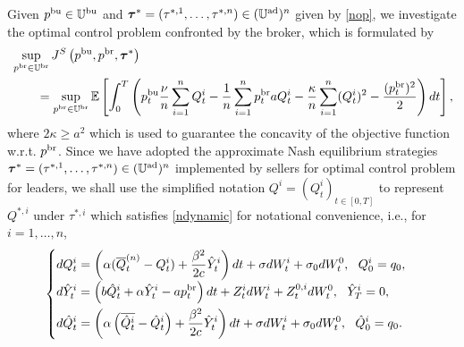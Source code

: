\documentclass[11pt]{article}
\numberwithin{equation}{section}
\begin{document}
Given $p^{{\rm bu}}\in\mathbb{U}^{\rm bu}$ and $\boldsymbol{\tau}^*=(\tau^{*,1}, \ldots, \tau^{*,n})\in(\mathbb{U}^{\rm ad})^n$ given by \eqref{nop}, we investigate the optimal control problem confronted by the broker, which is formulated by
\begin{align}\label{brp}
&\sup_{p^{{\rm br}}\in\mathbb{U}^{\rm br}}J^S\left(p^{{\rm bu}}, p^{{\rm br}}, \boldsymbol{\tau}^*\right)\nonumber\\
&\qquad=\sup_{p^{{\rm br}}\in\mathbb{U}^{\rm br}}\mathbb{E}\left[\int_0^T\left(p_t^{{\rm bu}}\frac{\nu}{n}\sum_{i=1}^nQ_t^i-\frac{1}{n}\sum_{i=1}^np_t^{{\rm br}}aQ_t^i-\frac{\kappa}{n}\sum_{i=1}^n( Q_t^i)^2-\frac{(p_t^{{\rm br}})^2}{2}\right)dt\right],
\end{align}
where $2\kappa\geq a^2$ which is used to guarantee the concavity of the objective function w.r.t. $p^{{\rm br}}$. Since we have adopted the approximate Nash equilibrium strategies $\boldsymbol{\tau}^*=(\tau^{*,1}, \ldots, \tau^{*,n})\in(\mathbb{U}^{\rm ad})^n$ implemented by sellers for optimal control problem for leaders, we shall use the simplified notation $Q^i=(Q_t^i)_{t\in[0,T]}$ to represent $Q^{*,i}$ under $\tau^{*,i}$ which satisfies \eqref{ndynamic} for notational convenience, i.e., for $i=1,\ldots,n$,
\begin{align}\label{fbsde4.1}
\begin{cases}
\displaystyle dQ_t^i=\left(\alpha(\overline{Q}_t^{(n)}-Q_t^i)+\frac{\beta^2}{2c}\hat{Y}_t^i\right)dt+\sigma dW_t^i+\sigma_0dW_t^0,~~Q_0^i=q_0,\\[0.6em]
\displaystyle d\hat{Y}_t^i=\left(b\hat{Q}_t^i+\alpha\hat{Y}_t^i- ap_t^{{\rm br}}\right)dt+Z_t^idW_t^i+Z_t^{0,i}dW_t^0,~~\hat{Y}_T^i=0,\\[0.6em]
\displaystyle d\hat{Q}_t^i=\left(\alpha\left(\overline{\hat{Q}_t^i}-\hat{Q}_t^i\right)+\frac{\beta^2}{2c}\hat{Y}_t^i\right)dt+\sigma dW_t^i+\sigma_0dW_t^0,~~\hat{Q}_0^i=q_0.
\end{cases}
\end{align}  
\end{document}

